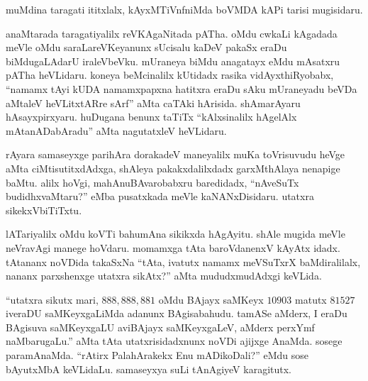 muMdina taragati ititxlalx, kAyxMTiVnfniMda boVMDA kAPi tarisi mugisidaru. 

\vskip 0.1cm

anaMtarada taragatiyalilx reVKAgaNitada pATha. oMdu cwkaLi kAgadada meVle oMdu saraLareVKeyanunx sUcisalu kaDeV pakaSx eraDu biMdugaLAdarU iraleVbeVku. mUraneya biMdu anagatayx eMdu mAsatxru pATha heVLidaru. koneya beMcinalilx kUtidadx rasika vidAyxthiRyobabx, ``namamx tAyi kUDA namamxpapxna hatitxra eraDu sAku mUraneyadu beVDa aMtaleV heVLitxtARre sArf'' aMta caTAki hArisida. shAmarAyaru hAsayxpirxyaru. huDugana benunx taTiTx ``kAlxsinalilx hAgelAlx mAtanADabAradu'' aMta nagutatxleV heVLidaru.

\vskip 0.1cm

rAyara samaseyxge parihAra dorakadeV maneyalilx muKa toVrisuvudu heVge aMta ciMtisutitxdAdxga, shAleya pakakxdalilxdadx garxMthAlaya nenapige baMtu. alilx hoVgi, mahAnuBAvarobabxru baredidadx, ``nAveSuTx budidhxvaMtaru?'' eMba pusatxkada meVle kaNANxDisidaru. utatxra sikekxVbiTiTxtu.

\vskip 0.1cm

lATariyalilx oMdu koVTi bahumAna sikikxda hAgAyitu. shAle mugida meVle neVravAgi manege hoVdaru. momamxga tAta baroVdanenxV kAyAtx idadx. tAtananx noVDida takaSxNa ``tAta, ivatutx namamx meVSuTxrX baMdiralilalx, nananx parxshenxge utatxra sikAtx?'' aMta mududxmudAdxgi keVLida.

\vskip 0.1cm

``utatxra sikutx mari, $888,888,881$ oMdu BAjayx saMKeyx $10903$ matutx $81527$ iveraDU saMKeyxgaLiMda adanunx BAgisabahudu. tamASe aMderx, I eraDu BAgisuva saMKeyxgaLU aviBAjayx saMKeyxgaLeV, aMderx perxYmf naMbarugaLu.'' aMta tAta utatxrisidadxnunx noVDi ajijxge AnaMda. sosege paramAnaMda. ``rAtirx PalahArakekx Enu mADikoDali?'' eMdu sose bAyutxMbA keVLidaLu. samaseyxya suLi tAnAgiyeV karagitutx.


